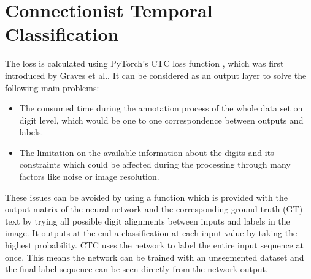 \section{Connectionist Temporal Classification}\label{sec:ctc}

The loss is calculated using PyTorch's CTC loss function \cite{pytorch_ctc},
which was first introduced by Graves et al.\cite{CTC}. It can be considered as
an output layer to solve the following main problems:
\begin{itemize}
\item The consumed time during the annotation process of the whole data set on
digit level, which would be one to one correspondence between outputs and
labels.
\item The limitation on the available information about the digits and its
constraints which could be affected during the processing through many factors
like noise or image resolution.
\end{itemize}
These issues can be avoided by using a function which is provided with the
output matrix of the neural network and the corresponding ground-truth (GT) text
by trying all possible digit alignments between inputs and labels in the image.
It outputs at the end a classification at each input value by taking the highest
probability. CTC uses the network to label the entire input sequence at once.
This means the network can be trained with an unsegmented dataset and the final
label sequence can be seen directly from the network output. 

